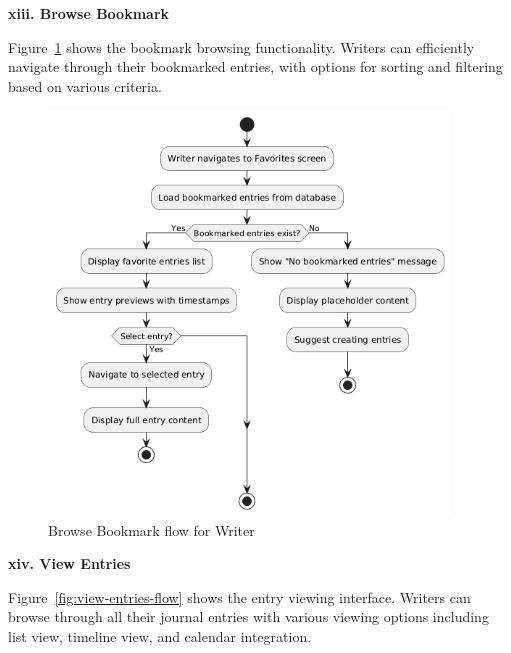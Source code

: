 \textbf{xiii. Browse Bookmark}

Figure~\ref{fig:browse-bookmark-flow} shows the bookmark browsing functionality. Writers can efficiently navigate through their bookmarked entries, with options for sorting and filtering based on various criteria.

\begin{figure}[H]
\centering
\includegraphics[width=0.95\textwidth,height=0.7\textheight,keepaspectratio]{files/imgs/browse_bookmark_flow.png}
\caption{Browse Bookmark flow for Writer}
\label{fig:browse-bookmark-flow}
\end{figure}
\clearpage

\textbf{xiv. View Entries}

Figure~\ref{fig:view-entries-flow} shows the entry viewing interface. Writers can browse through all their journal entries with various viewing options including list view, timeline view, and calendar integration.

